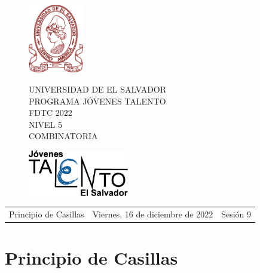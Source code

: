 \documentclass[12pt]{article}
\newcommand{\tema}{Principio de Casillas}
\newcommand{\fecha}{Viernes, 16 de diciembre de 2022}
\newcommand{\sesion}{Sesión 9}
\begin{document}
\thispagestyle{empty}

\begin{figure}[h] 
	\begin{minipage}[b]{0.26\textwidth}
		\begin{center}
			\includegraphics[height=3cm]{Logos/UES.png}
			\par\end{center}
	\end{minipage} 
	\begin{minipage}[b]{0.46\textwidth}
		\begin{center}
			UNIVERSIDAD DE EL SALVADOR\\ [0.1cm]
			PROGRAMA JÓVENES TALENTO\\ [0.1cm]
	        FDTC 2022\\ [0.1cm]
                NIVEL 5\\ [0.1cm]
			COMBINATORIA 
			\par\end{center}
	\end{minipage} 
	\begin{minipage}[b]{0.05\textwidth}
		\begin{center}
			\includegraphics[height=2cm]{Logos/LOGO PJT.png}
			\par\end{center}
	\end{minipage}
\end{figure}

\begin{center}
    \begin{tabular}{p{4.5cm} p{7cm} p{4.5cm}}
        \tema & \centering\fecha & \hfill\sesion
    \end{tabular}
\end{center}

\section{Principio de Casillas}
\end{document}
